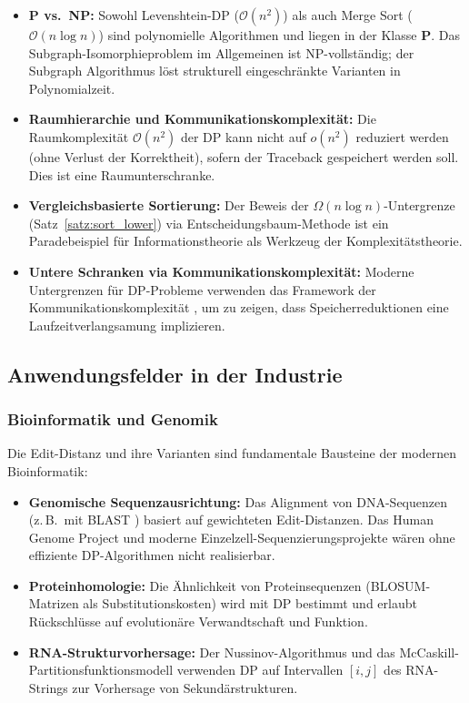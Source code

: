 ﻿\documentclass[a4paper,12pt]{article}
\theoremstyle{definition}
\begin{document}
\begin{itemize}
    \item \textbf{P vs.\ NP:} Sowohl Levenshtein-DP ($\mathcal{O}(n^2)$) als auch
          Merge Sort ($\mathcal{O}(n \log n)$) sind polynomielle Algorithmen und
          liegen in der Klasse $\mathbf{P}$. Das Subgraph-Isomorphieproblem im
          Allgemeinen ist NP-vollständig; der Subgraph Algorithmus \cite{epp2026subgraph}
          löst strukturell eingeschränkte Varianten in Polynomialzeit.
    \item \textbf{Raumhierarchie und Kommunikationskomplexität:}
          Die Raumkomplexität $\mathcal{O}(n^2)$ der DP kann nicht auf
          $o(n^2)$ reduziert werden (ohne Verlust der Korrektheit), sofern der
          Traceback gespeichert werden soll. Dies ist eine Raumunterschranke.
    \item \textbf{Vergleichsbasierte Sortierung:} Der Beweis der
          $\Omega(n \log n)$-Untergrenze (Satz~\ref{satz:sort_lower}) via
          Entscheidungsbaum-Methode ist ein Paradebeispiel für Informationstheorie
          als Werkzeug der Komple\-xi\-täts\-theorie.
    \item \textbf{Untere Schranken via Kommunikationskomplexität:}
          Moderne Untergrenzen für DP-Probleme verwenden das Framework der
          Kommunikationskomplexität \cite{kushilevitz1997}, um zu zeigen, dass
          Speicherreduktionen eine Laufzeitverlangsamung implizieren.
\end{itemize}

\subsection{Anwendungsfelder in der Industrie}

\subsubsection{Bioinformatik und Genomik}

Die Edit-Distanz und ihre Varianten sind fundamentale Bausteine der modernen
Bioinformatik:
\begin{itemize}
    \item \textbf{Genomische Sequenzausrichtung:} Das Alignment von DNA-Sequenzen
          (z.\,B.\ mit BLAST \cite{altschul1990}) basiert auf gewichteten Edit-Distanzen.
          Das Human Genome Project und moderne Einzelzell-Sequenzierungsprojekte
          wären ohne effiziente DP-Algorithmen nicht realisierbar.
    \item \textbf{Proteinhomologie:} Die Ähnlichkeit von Proteinsequenzen
          (BLOSUM-Matrizen als Substitutionskosten) wird mit DP bestimmt und
          erlaubt Rückschlüsse auf evolutionäre Verwandtschaft und Funktion.
    \item \textbf{RNA-Strukturvorhersage:} Der Nussinov-Algorithmus und das
          McCaskill-Partitionsfunktionsmodell verwenden DP auf Intervallen
          $[i, j]$ des RNA-Strings zur Vorhersage von Sekundärstrukturen.
\end{itemize}
\end{document}
